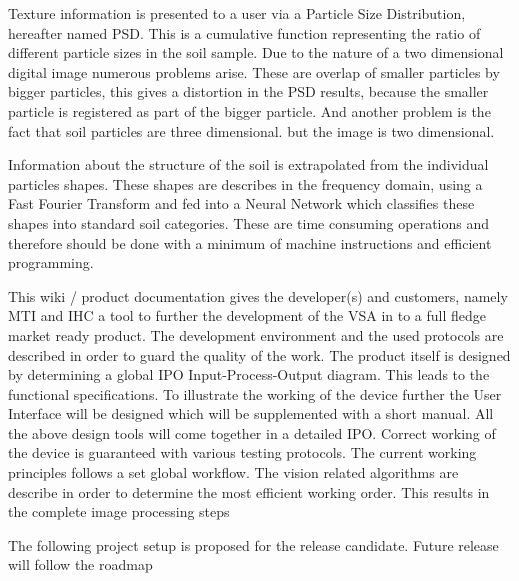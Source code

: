 Texture information is presented to a user via a Particle Size Distribution, hereafter named PSD. This is a cumulative function representing the ratio of different particle sizes in the soil sample. Due to the nature of a two dimensional digital image numerous problems arise. These are overlap of smaller particles by bigger particles, this gives a distortion in the PSD results, because the smaller particle is registered as part of the bigger particle. And another problem is the fact that soil particles are three dimensional. but the image is two dimensional.

Information about the structure of the soil is extrapolated from the individual particles shapes. These shapes are describes in the frequency domain, using a Fast Fourier Transform and fed into a Neural Network which classifies these shapes into standard soil categories. These are time consuming operations and therefore should be done with a minimum of machine instructions and efficient programming.

This wiki / product documentation gives the developer(s) and customers, namely MTI and IHC a tool to further the development of the VSA in to a full fledge market ready product. The development environment and the used protocols are described in order to guard the quality of the work. The product itself is designed by determining a global IPO Input-Process-Output diagram. This leads to the functional specifications. To illustrate the working of the device further the User Interface will be designed which will be supplemented with a short manual. All the above design tools will come together in a detailed IPO. Correct working of the device is guaranteed with various testing protocols. The current working principles follows a set global workflow. The vision related algorithms are describe in order to determine the most efficient working order. This results in the complete image processing steps

The following project setup is proposed for the release candidate. Future release will follow the roadmap
